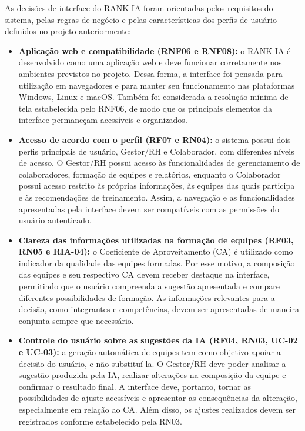 \documentclass[a4paper,12pt,oneside,openany]{book}
\begin{document}
As decisões de interface do RANK-IA foram orientadas pelos requisitos do sistema, pelas regras de negócio e pelas características dos perfis de usuário definidos no projeto anteriormente:
\\
\begin{itemize}[nosep]

\item \textbf{Aplicação web e compatibilidade (RNF06 e RNF08):} o RANK-IA é desenvolvido como uma aplicação web e deve funcionar corretamente nos ambientes previstos no projeto. Dessa forma, a interface foi pensada para utilização em navegadores e para manter seu funcionamento nas plataformas Windows, Linux e macOS. Também foi considerada a resolução mínima de tela estabelecida pelo RNF06, de modo que os principais elementos da interface permaneçam acessíveis e organizados.

\item \textbf{Acesso de acordo com o perfil (RF07 e RN04):} o sistema possui dois perfis principais de usuário, Gestor/RH e Colaborador, com diferentes níveis de acesso. O Gestor/RH possui acesso às funcionalidades de gerenciamento de colaboradores, formação de equipes e relatórios, enquanto o Colaborador possui acesso restrito às próprias informações, às equipes das quais participa e às recomendações de treinamento. Assim, a navegação e as funcionalidades apresentadas pela interface devem ser compatíveis com as permissões do usuário autenticado.

\item \textbf{Clareza das informações utilizadas na formação de equipes (RF03, RN05 e RIA-04):} o Coeficiente de Aproveitamento (CA) é utilizado como indicador da qualidade das equipes formadas. Por esse motivo, a composição das equipes e seu respectivo CA devem receber destaque na interface, permitindo que o usuário compreenda a sugestão apresentada e compare diferentes possibilidades de formação. As informações relevantes para a decisão, como integrantes e competências, devem ser apresentadas de maneira conjunta sempre que necessário.

\item \textbf{Controle do usuário sobre as sugestões da IA (RF04, RN03, UC-02 e UC-03):} a geração automática de equipes tem como objetivo apoiar a decisão do usuário, e não substituí-la. O Gestor/RH deve poder analisar a sugestão produzida pela IA, realizar alterações na composição da equipe e confirmar o resultado final. A interface deve, portanto, tornar as possibilidades de ajuste acessíveis e apresentar as consequências da alteração, especialmente em relação ao CA. Além disso, os ajustes realizados devem ser registrados conforme estabelecido pela RN03.


\end{itemize}
\end{document}
